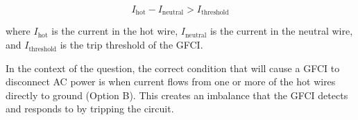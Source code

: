 \[
I_{\text{hot}} - I_{\text{neutral}} > I_{\text{threshold}}
\]

where \( I_{\text{hot}} \) is the current in the hot wire, \( I_{\text{neutral}} \) is the current in the neutral wire, and \( I_{\text{threshold}} \) is the trip threshold of the GFCI.

In the context of the question, the correct condition that will cause a GFCI to disconnect AC power is when current flows from one or more of the hot wires directly to ground (Option B). This creates an imbalance that the GFCI detects and responds to by tripping the circuit.


